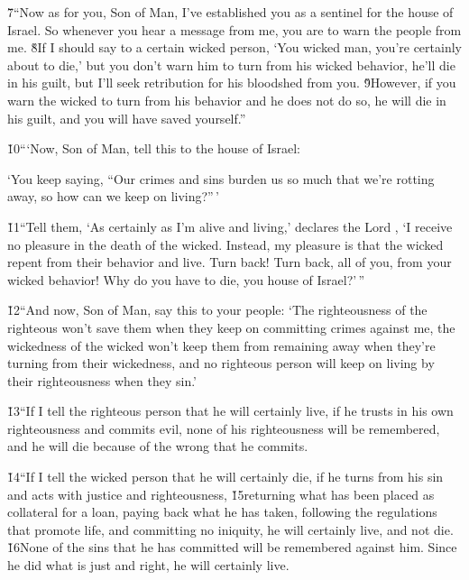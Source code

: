 \v{7}``Now as for you, Son of Man, I've established you as a sentinel for the house of Israel. So whenever you hear a message from me, you are to warn the people from me. \v{8}If I should say to a certain wicked person, `You wicked man, you're certainly about to die,' but you don't warn him to turn from his wicked behavior, he'll die in his guilt, but I'll seek retribution for his bloodshed from you. \v{9}However, if you warn the wicked to turn from his behavior and he does not do so, he will die in his guilt, and you will have saved yourself.''

\v{10}```Now, Son of Man, tell this to the house of Israel:

`You keep saying, ``Our crimes and sins burden us so much that we're rotting away, so how can we keep on living?''\,'

\v{11}``Tell them, `As certainly as I'm alive and living,' declares the Lord , `I receive no pleasure in the death of the wicked. Instead, my pleasure is that the wicked repent from their behavior and live. Turn back! Turn back, all of you, from your wicked behavior! Why do you have to die, you house of Israel?'\,''

\v{12}``And now, Son of Man, say this to your people: `The righteousness of the righteous won't save them when they keep on committing crimes against me, the wickedness of the wicked won't keep them from remaining away when they're turning from their wickedness, and no righteous person will keep on living by their righteousness when they sin.'

\v{13}``If I tell the righteous person that he will certainly live, if he trusts in his own righteousness and commits evil, none of his righteousness will be remembered, and he will die because of the wrong that he commits.

\v{14}``If I tell the wicked person that he will certainly die, if he turns from his sin and acts with justice and righteousness, \v{15}returning what has been placed as collateral for a loan, paying back what he has taken, following the regulations that promote life, and committing no iniquity, he will certainly live, and not die. \v{16}None of the sins that he has committed will be remembered against him. Since he did what is just and right, he will certainly live.

